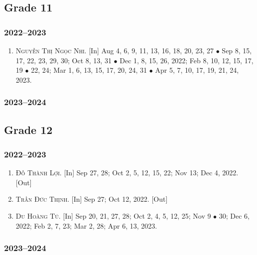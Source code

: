 \documentclass{article}
\begin{document}
\subsection{Grade 11}

\subsubsection{2022--2023}

\begin{enumerate}
	\item \textsc{Nguyễn Thị Ngọc Nhi.} \textsf{[In]} Aug 4, 6, 9, 11, 13, 16, 18, 20, 23, 27 $\bullet$ Sep 8, 15, 17, 22, 23, 29, 30; Oct 8, 13, 31 $\bullet$ Dec 1, 8,  15, 26, 2022; Feb 8, 10, 12, 15, 17, 19 $\bullet$ 22, 24; Mar 1, 6, 13, 15, 17, 20, 24, 31 $\bullet$ Apr 5, 7, 10, 17, 19, 21, 24, 2023.
\end{enumerate}

\subsubsection{2023--2024}

\subsection{Grade 12}

\subsubsection{2022--2023}

\begin{enumerate}
	\item \textsc{Đỗ Thành Lợi.} \textsf{[In]} Sep 27, 28; Oct 2, 5, 12, 15, 22; Nov 13; Dec 4, 2022. \textsf{[Out]}
	\item \textsc{Trần Đức Thịnh.} \textsf{[In]} Sep 27; Oct 12, 2022.  \textsf{[Out]}
	\item \textsc{Du Hoàng Tú.} \textsf{[In]} Sep 20, 21, 27, 28; Oct 2, 4, 5, 12, 25; Nov 9 $\bullet$ 30; Dec 6, 2022; Feb 2, 7, 23; Mar 2, 28; Apr 6, 13, 2023.
\end{enumerate}

\subsubsection{2023--2024}

\end{document}
